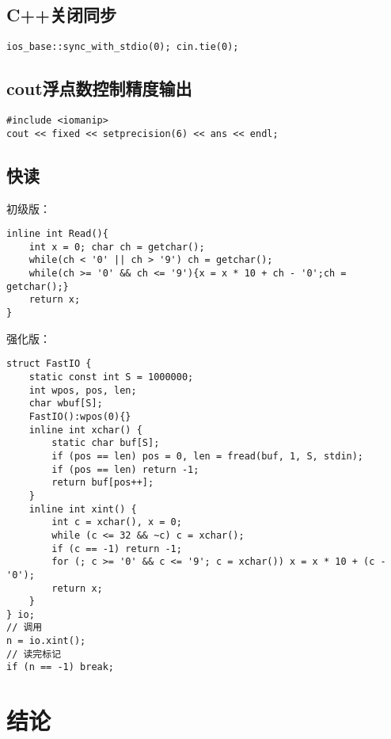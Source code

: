 \subsection{C++关闭同步}
\begin{lstlisting}
ios_base::sync_with_stdio(0); cin.tie(0);
\end{lstlisting}

\subsection{cout浮点数控制精度输出}
\begin{lstlisting}
#include <iomanip>
cout << fixed << setprecision(6) << ans << endl;
\end{lstlisting}

\subsection{快读}
初级版：
\begin{lstlisting}
inline int Read(){
    int x = 0; char ch = getchar();
    while(ch < '0' || ch > '9') ch = getchar();
    while(ch >= '0' && ch <= '9'){x = x * 10 + ch - '0';ch = getchar();}
    return x;
}
\end{lstlisting}
强化版：
\begin{lstlisting}
struct FastIO {
	static const int S = 1000000;
	int wpos, pos, len;
	char wbuf[S];
	FastIO():wpos(0){}
	inline int xchar() {
		static char buf[S];
		if (pos == len) pos = 0, len = fread(buf, 1, S, stdin);
		if (pos == len) return -1;
		return buf[pos++];
	}
	inline int xint() {
		int c = xchar(), x = 0;
		while (c <= 32 && ~c) c = xchar();
		if (c == -1) return -1;
		for (; c >= '0' && c <= '9'; c = xchar()) x = x * 10 + (c - '0');
		return x;
	}
} io;
// 调用
n = io.xint();
// 读完标记
if (n == -1) break;
\end{lstlisting}

\clearpage
\section{结论}

